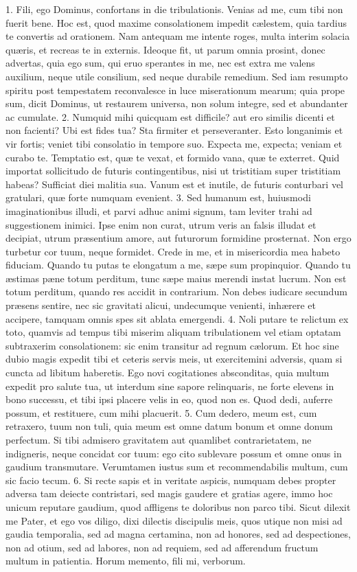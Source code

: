 \documentclass[twoside]{article}
\begin{document}
1. Fili, ego Dominus, confortans in die tribulationis. Venias ad me, cum tibi non fuerit bene. Hoc est, quod maxime consolationem impedit cælestem, quia tardius te convertis ad orationem. Nam antequam me intente roges, multa interim solacia quæris, et recreas te in externis. Ideoque fit, ut parum omnia prosint, donec advertas, quia ego sum, qui eruo sperantes in me, nec est extra me valens auxilium, neque utile consilium, sed neque durabile remedium. Sed iam resumpto spiritu post tempestatem reconvalesce in luce miserationum mearum; quia prope sum, dicit Dominus, ut restaurem universa, non solum integre, sed et abundanter ac cumulate.
2. Numquid mihi quicquam est difficile? aut ero similis dicenti et non facienti? Ubi est fides tua? Sta firmiter et perseveranter. Esto longanimis et vir fortis; veniet tibi consolatio in tempore suo. Expecta me, expecta; veniam et curabo te. Temptatio est, quæ te vexat, et formido vana, quæ te exterret. Quid importat sollicitudo de futuris contingentibus, nisi ut tristitiam super tristitiam habeas? Sufficiat diei malitia sua. Vanum est et inutile, de futuris conturbari vel gratulari, quæ forte numquam evenient.
3. Sed humanum est, huiusmodi imaginationibus illudi, et parvi adhuc animi signum, tam leviter trahi ad suggestionem inimici. Ipse enim non curat, utrum veris an falsis illudat et decipiat, utrum præsentium amore, aut futurorum formidine prosternat. Non ergo turbetur cor tuum, neque formidet. Crede in me, et in misericordia mea habeto fiduciam. Quando tu putas te elongatum a me, sæpe sum propinquior. Quando tu æstimas pæne totum perditum, tunc sæpe maius merendi instat lucrum. Non est totum perditum, quando res accidit in contrarium. Non debes iudicare secundum præsens sentire, nec sic gravitati alicui, undecumque venienti, inhærere et accipere, tamquam omnis spes sit ablata emergendi.
4. Noli putare te relictum ex toto, quamvis ad tempus tibi miserim aliquam tribulationem vel etiam optatam subtraxerim consolationem: sic enim transitur ad regnum cælorum. Et hoc sine dubio magis expedit tibi et ceteris servis meis, ut exercitemini adversis, quam si cuncta ad libitum haberetis. Ego novi cogitationes absconditas, quia multum expedit pro salute tua, ut interdum sine sapore relinquaris, ne forte elevens in bono successu, et tibi ipsi placere velis in eo, quod non es. Quod dedi, auferre possum, et restituere, cum mihi placuerit.
5. Cum dedero, meum est, cum retraxero, tuum non tuli, quia meum est omne datum bonum et omne donum perfectum. Si tibi admisero gravitatem aut quamlibet contrarietatem, ne indigneris, neque concidat cor tuum: ego cito sublevare possum et omne onus in gaudium transmutare. Verumtamen iustus sum et recommendabilis multum, cum sic facio tecum.
6. Si recte sapis et in veritate aspicis, numquam debes propter adversa tam deiecte contristari, sed magis gaudere et gratias agere, immo hoc unicum reputare gaudium, quod affligens te doloribus non parco tibi. Sicut dilexit me Pater, et ego vos diligo, dixi dilectis discipulis meis, quos utique non misi ad gaudia temporalia, sed ad magna certamina, non ad honores, sed ad despectiones, non ad otium, sed ad labores, non ad requiem, sed ad afferendum fructum multum in patientia. Horum memento, fili mi, verborum.
\end{document}
